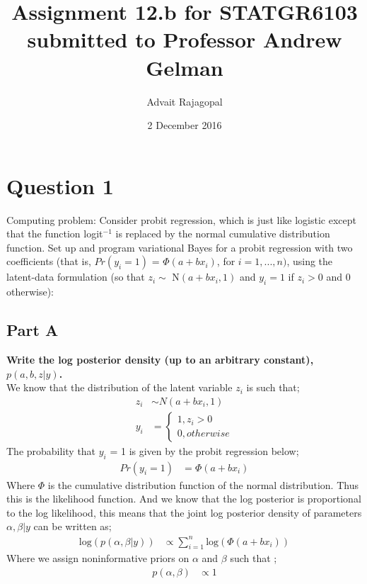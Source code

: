 \documentclass{article}
\title{Assignment 12.b for \textbf{STATGR6103}\\
\large submitted to Professor Andrew Gelman}
\date{2 December 2016}
\author{Advait Rajagopal}
\begin{document}
  \maketitle
  \section{Question 1}
Computing problem: Consider probit regression, which is just like logistic except that the function logit$^{-1}$ is replaced by the normal cumulative distribution function. Set up and program variational Bayes for a probit regression with two coefficients (that is, $Pr(y_i = 1)$ = $\Phi(a + bx_i)$, for $i = 1, . . . , n)$, using the latent-data formulation (so that $z_i \sim$ N$(a + bx_i, 1)$ and $y_i = 1$ if $z_i > 0$ and 0 otherwise):

\subsection{Part A}
\textbf{Write the log posterior density (up to an arbitrary constant), $p(a, b, z|y)$.}\\
We know that the distribution of the latent variable $z_i$ is such that;
\begin{align*}
z_i &\sim N(a + bx_i, 1)\\
y_i &= 
\begin{cases}
1 , z_i > 0\\
0, otherwise
\end{cases}
\end{align*}
The probability that $y_i$ = 1 is given by the probit regression below;
\begin{align*}
Pr(y_i = 1) &= \Phi(a + bx_i)
\end{align*}
Where $\Phi$ is the cumulative distribution function of the normal distribution. Thus this is the likelihood function. And we know that the log posterior is proportional to the log likelihood, this means that the joint log posterior density of parameters $\alpha, \beta | y$ can be written as;
\begin{align*}
\text{log}(p(\alpha, \beta | y)) &\propto \sum_{i=1}^{n} \text{log}(\Phi(a + bx_i))
\end{align*}
Where we assign noninformative priors on $\alpha$ and $\beta$ such that ;
\begin{align*}
p(\alpha, \beta) &\propto 1
\end{align*}
\end{document}

